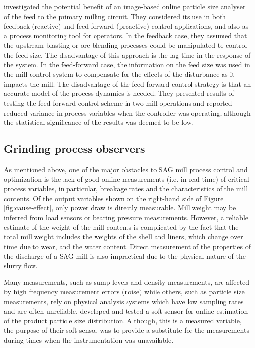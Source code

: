\cite{steyn_investigating_2018} investigated the potential benefit of an image-based online particle size analyser of the feed to the primary milling circuit. They considered its use in both feedback (reactive) and feed-forward (proactive) control applications, and also as a process monitoring tool for operators. In the feedback case, they assumed that the upstream blasting or ore blending processes could be manipulated to control the feed size. The disadvantage of this approach is the lag time in the response of the system. In the feed-forward case, the information on the feed size was used in the mill control system to compensate for the effects of the disturbance as it impacts the mill. The disadvantage of the feed-forward control strategy is that an accurate model of the process dynamics is needed. They presented results of testing the feed-forward control scheme in two mill operations and reported reduced variance in process variables when the controller was operating, although the statistical significance of the results was deemed to be low.

\subsection{Grinding process observers}

As mentioned above, one of the major obstacles to \acrshort{SAG} mill process control and optimization is the lack of good online measurements (i.e. in real time) of critical process variables, in particular, breakage rates and the characteristics of the mill contents. Of the output variables shown on the right-hand side of Figure \ref{fig:cause-effect}, only power draw is directly measurable. Mill weight may be inferred from load sensors or bearing pressure measurements. However, a reliable estimate of the weight of the mill contents is complicated by the fact that the total mill weight includes the weights of the shell and liners, which change over time due to wear, and the water content. Direct measurement of the properties of the discharge of a \acrshort{SAG} mill is also impractical due to the physical nature of the slurry flow.

Many measurements, such as sump levels and density measurements, are affected by high frequency measurement errors (noise) while others, such as particle size measurements, rely on physical analysis systems which have low sampling rates and are often unreliable. \cite{casali_particle_1998} developed and tested a soft-sensor for online estimation of the product particle size distribution. Although, this is a measured variable, the purpose of their soft sensor was to provide a substitute for the measurements during times when the instrumentation was unavailable.

